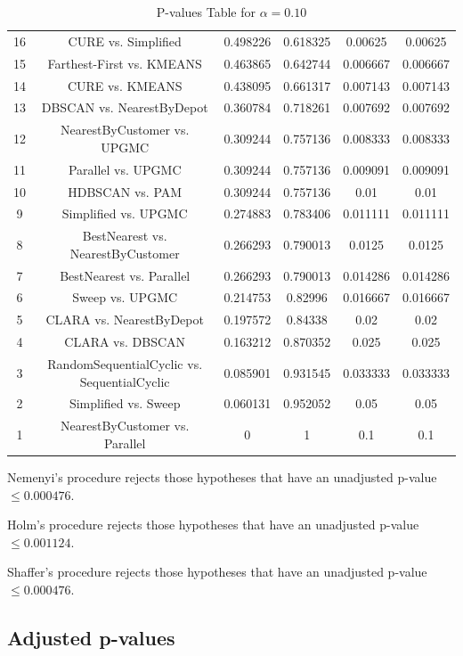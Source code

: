 \documentclass[a4paper,10pt]{article}
\begin{document}
\begin{landscape}
\begin{table}[!htp]
\begin{tabular}{cccccc}
16&CURE vs. Simplified&0.498226&0.618325&0.00625&0.00625\\
15&Farthest-First vs. KMEANS&0.463865&0.642744&0.006667&0.006667\\
14&CURE vs. KMEANS&0.438095&0.661317&0.007143&0.007143\\
13&DBSCAN vs. NearestByDepot&0.360784&0.718261&0.007692&0.007692\\
12&NearestByCustomer vs. UPGMC&0.309244&0.757136&0.008333&0.008333\\
11&Parallel vs. UPGMC&0.309244&0.757136&0.009091&0.009091\\
10&HDBSCAN vs. PAM&0.309244&0.757136&0.01&0.01\\
9&Simplified vs. UPGMC&0.274883&0.783406&0.011111&0.011111\\
8&BestNearest vs. NearestByCustomer&0.266293&0.790013&0.0125&0.0125\\
7&BestNearest vs. Parallel&0.266293&0.790013&0.014286&0.014286\\
6&Sweep vs. UPGMC&0.214753&0.82996&0.016667&0.016667\\
5&CLARA vs. NearestByDepot&0.197572&0.84338&0.02&0.02\\
4&CLARA vs. DBSCAN&0.163212&0.870352&0.025&0.025\\
3&RandomSequentialCyclic vs. SequentialCyclic&0.085901&0.931545&0.033333&0.033333\\
2&Simplified vs. Sweep&0.060131&0.952052&0.05&0.05\\
1&NearestByCustomer vs. Parallel&0&1&0.1&0.1\\
\hline
\end{tabular}
\caption{P-values Table for $\alpha=0.10$}
\end{table}Nemenyi's procedure rejects those hypotheses that have an unadjusted p-value $\le0.000476$.

Holm's procedure rejects those hypotheses that have an unadjusted p-value $\le0.001124$.

Shaffer's procedure rejects those hypotheses that have an unadjusted p-value $\le0.000476$.

\pagebreak

\subsection{Adjusted p-values}


\end{landscape}
\end{document}
